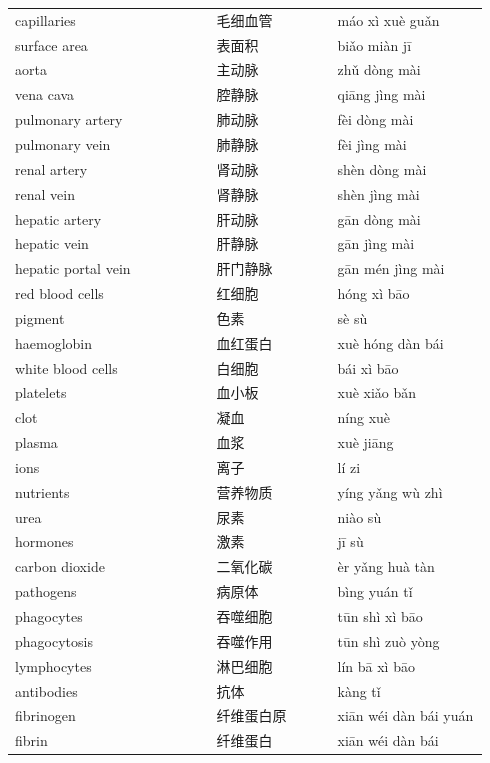\documentclass[11pt]{article}
\begin{document}
\begin{longtable}{@{}p{0.40\linewidth}p{0.24\linewidth}p{0.30\linewidth}@{}}
capillaries & 毛细血管 & máo xì xuè guǎn \\
surface area & 表面积 & biǎo miàn jī \\
aorta & 主动脉 & zhǔ dòng mài \\
vena cava & 腔静脉 & qiāng jìng mài \\
pulmonary artery & 肺动脉 & fèi dòng mài \\
pulmonary vein & 肺静脉 & fèi jìng mài \\
renal artery & 肾动脉 & shèn dòng mài \\
renal vein & 肾静脉 & shèn jìng mài \\
hepatic artery & 肝动脉 & gān dòng mài \\
hepatic vein & 肝静脉 & gān jìng mài \\
hepatic portal vein & 肝门静脉 & gān mén jìng mài \\
red blood cells & 红细胞 & hóng xì bāo \\
pigment & 色素 & sè sù \\
haemoglobin & 血红蛋白 & xuè hóng dàn bái \\
white blood cells & 白细胞 & bái xì bāo \\
platelets & 血小板 & xuè xiǎo bǎn \\
clot & 凝血 & níng xuè \\
plasma & 血浆 & xuè jiāng \\
ions & 离子 & lí zi \\
nutrients & 营养物质 & yíng yǎng wù zhì \\
urea & 尿素 & niào sù \\
hormones & 激素 & jī sù \\
carbon dioxide & 二氧化碳 & èr yǎng huà tàn \\
pathogens & 病原体 & bìng yuán tǐ \\
phagocytes & 吞噬细胞 & tūn shì xì bāo \\
phagocytosis & 吞噬作用 & tūn shì zuò yòng \\
lymphocytes & 淋巴细胞 & lín bā xì bāo \\
antibodies & 抗体 & kàng tǐ \\
fibrinogen & 纤维蛋白原 & xiān wéi dàn bái yuán \\
fibrin & 纤维蛋白 & xiān wéi dàn bái \\
\end{longtable}
\end{document}
